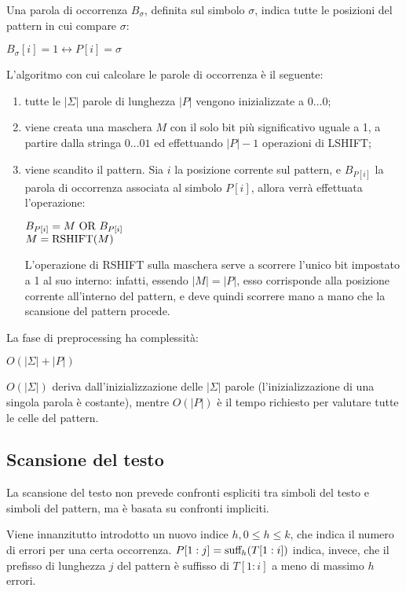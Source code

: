 Una parola di occorrenza $B_{\sigma}$, definita sul simbolo $\sigma$, indica tutte le posizioni del pattern in cui compare $\sigma$:
\begin{center}
    $B_{\sigma}[i] = 1 \longleftrightarrow P[i] = \sigma$
\end{center}
L'algoritmo con cui calcolare le parole di occorrenza è il seguente:
\begin{enumerate}
    \item tutte le $|\Sigma|$ parole di lunghezza $|P|$ vengono inizializzate a $0\ldots0$;
    \item viene creata una maschera $M$ con il solo bit più significativo uguale a 1, a partire dalla stringa $0\ldots01$ ed effettuando $|P| - 1$ operazioni di LSHIFT;
    \item viene scandito il pattern.
    Sia $i$ la posizione corrente sul pattern, e $B_{P[i]}$ la parola di occorrenza associata al simbolo $P[i]$, allora verrà effettuata l'operazione:
    \begin{center}
        $B_{P[i]} = M \textnormal{ OR } B_{P[i]}$\\
        $M = \textnormal{RSHIFT}(M)$
    \end{center}
    L'operazione di RSHIFT sulla maschera serve a scorrere l'unico bit impostato a 1 al suo interno: infatti, essendo $|M| = |P|$, esso corrisponde alla posizione corrente all'interno del pattern, e deve quindi scorrere mano a mano che la scansione del pattern procede.
\end{enumerate}
La fase di preprocessing ha complessità:
\begin{center}
    $O(|\Sigma| + |P|)$
\end{center}
$O(|\Sigma|)$ deriva dall'inizializzazione delle $|\Sigma|$ parole (l'inizializzazione di una singola parola è costante), mentre $O(|P|)$ è il tempo richiesto per valutare tutte le celle del pattern.

\subsection{Scansione del testo}
La scansione del testo non prevede confronti espliciti tra simboli del testo e simboli del pattern, ma è basata su confronti impliciti.

Viene innanzitutto introdotto un nuovo indice $h, 0 \le h \le k$, che indica il numero di errori per una certa occorrenza.
$P[1:j] = \textnormal{suff}_h(T[1:i])$ indica, invece, che il prefisso di lunghezza $j$ del pattern è suffisso di $T[1:i]$ a meno di massimo $h$ errori.

